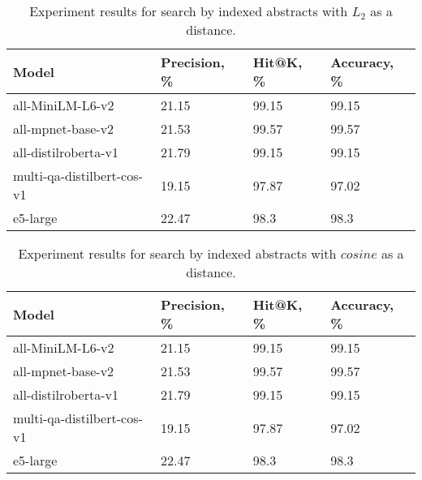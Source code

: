 \begin{table*}[!htbp]
    \small
    \centering
    \caption{Experiment results for search by indexed abstracts with \(L_{2}\) as a distance.}

    \begin{tabularx}{0.99\textwidth}{XIII}

        \toprule

        \bfseries Model & \bfseries Precision, \% & \bfseries Hit@K, \% & \bfseries Accuracy, \% \\

        \midrule
        
        all-MiniLM-L6-v2	& 21.15 &	99.15 &	99.15 \\
        all-mpnet-base-v2	& 21.53 &	99.57 &	99.57 \\
        all-distilroberta-v1	& 21.79 &	99.15 &	99.15 \\
        multi-qa-distilbert-cos-v1	& 19.15 &	97.87 &	97.02 \\
        e5-large	& 22.47 &	98.3  &	98.3 \\

        \bottomrule

    \end{tabularx}

    \label{tab:experiments:abs-l2}
\end{table*}

\begin{table*}[!htbp]
    \small
    \centering
    \caption{Experiment results for search by indexed abstracts with \(cosine\) as a distance.}

    \begin{tabularx}{0.99\textwidth}{XIII}

        \toprule

        \bfseries Model & \bfseries Precision, \% & \bfseries Hit@K, \% & \bfseries Accuracy, \% \\

        \midrule
        
        all-MiniLM-L6-v2	& 21.15 &	99.15 &	99.15 \\
        all-mpnet-base-v2	& 21.53 &	99.57 &	99.57 \\
        all-distilroberta-v1	& 21.79 &	99.15 &	99.15 \\
        multi-qa-distilbert-cos-v1	& 19.15 &	97.87 &	97.02 \\
        e5-large	& 22.47 &	98.3  &	98.3 \\

        \bottomrule

    \end{tabularx}

    \label{tab:experiments:abs-cos}
\end{table*}

